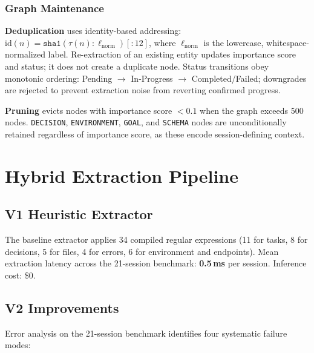 \documentclass[journal]{IEEEtran}
\begin{document}
\subsubsection{Graph Maintenance}
\textbf{Deduplication} uses identity-based addressing:
$\mathrm{id}(n) = \texttt{sha1}(\tau(n):\ell_\mathrm{norm})[:12]$,
where $\ell_\mathrm{norm}$ is the lowercase, whitespace-normalized
label.
Re-extraction of an existing entity updates importance score
and status; it does not create a duplicate node.
Status transitions obey monotonic ordering:
Pending $\to$ In-Progress $\to$ Completed/Failed;
downgrades are rejected to prevent extraction noise from
reverting confirmed progress.

\textbf{Pruning} evicts nodes with importance score $< 0.1$
when the graph exceeds 500 nodes.
\texttt{DECISION}, \texttt{ENVIRONMENT}, \texttt{GOAL}, and
\texttt{SCHEMA} nodes are unconditionally retained regardless
of importance score, as these encode session-defining context.

\section{Hybrid Extraction Pipeline}
\label{sec:extraction}

\subsection{V1 Heuristic Extractor}

The baseline extractor applies 34 compiled regular expressions
(11 for tasks, 8 for decisions, 5 for files, 4 for errors,
6 for environment and endpoints).
Mean extraction latency across the 21-session benchmark:
\textbf{0.5\,ms} per session.
Inference cost: \$0.

\subsection{V2 Improvements}
\label{sec:v2}

Error analysis on the 21-session benchmark identifies four
systematic failure modes:
\end{document}
